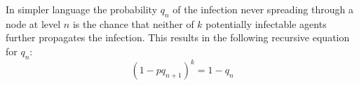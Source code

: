 \documentclass[a4paper]{article}
\begin{document}
In simpler language the probability $q_n$ of the infection never spreading
through a node at level $n$ is the chance that neither of $k$ potentially
infectable agents further propagates the infection. This results in the
following recursive equation for $q_n$:
\[(1-pq_{n+1})^k = 1-q_n\]




\end{document}
